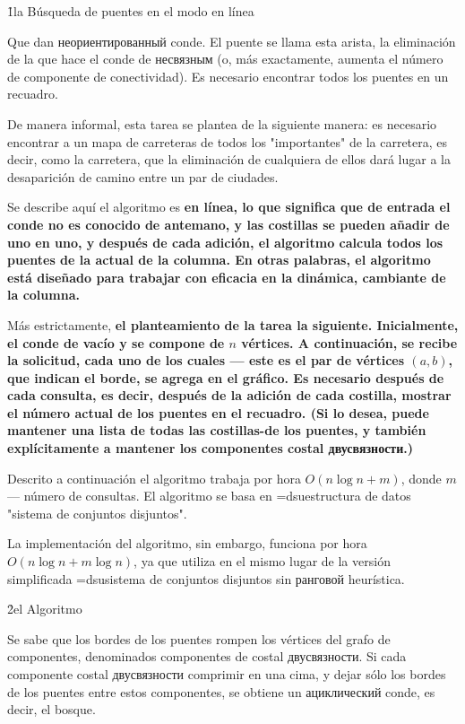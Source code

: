 \h1{la Búsqueda de puentes en el modo en línea}

Que dan неориентированный conde. El puente se llama esta arista, la eliminación de la que hace el conde de несвязным (o, más exactamente, aumenta el número de componente de conectividad). Es necesario encontrar todos los puentes en un recuadro.

De manera informal, esta tarea se plantea de la siguiente manera: es necesario encontrar a un mapa de carreteras de todos los "importantes" de la carretera, es decir, como la carretera, que la eliminación de cualquiera de ellos dará lugar a la desaparición de camino entre un par de ciudades.

Se describe aquí el algoritmo es \bf{en línea}, lo que significa que de entrada el conde no es conocido de antemano, y las costillas se pueden añadir de uno en uno, y después de cada adición, el algoritmo calcula todos los puentes de la actual de la columna. En otras palabras, el algoritmo está diseñado para trabajar con eficacia en la dinámica, cambiante de la columna.

Más estrictamente, \bf{el planteamiento de la tarea} la siguiente. Inicialmente, el conde de vacío y se compone de $n$ vértices. A continuación, se recibe la solicitud, cada uno de los cuales --- este es el par de vértices $(a,b)$, que indican el borde, se agrega en el gráfico. Es necesario después de cada consulta, es decir, después de la adición de cada costilla, mostrar el número actual de los puentes en el recuadro. (Si lo desea, puede mantener una lista de todas las costillas-de los puentes, y también explícitamente a mantener los componentes costal двусвязности.)

Descrito a continuación el algoritmo trabaja por hora $O (n \log n + m)$, donde $m$ --- número de consultas. El algoritmo se basa en \algohref=dsu{estructura de datos "sistema de conjuntos disjuntos"}.

La implementación del algoritmo, sin embargo, funciona por hora $O (n \log n + m \log n)$, ya que utiliza en el mismo lugar de la versión simplificada \algohref=dsu{sistema de conjuntos disjuntos} sin ранговой heurística.


\h2{el Algoritmo}

Se sabe que los bordes de los puentes rompen los vértices del grafo de componentes, denominados componentes de costal двусвязности. Si cada componente costal двусвязности comprimir en una cima, y dejar sólo los bordes de los puentes entre estos componentes, se obtiene un ациклический conde, es decir, el bosque.

